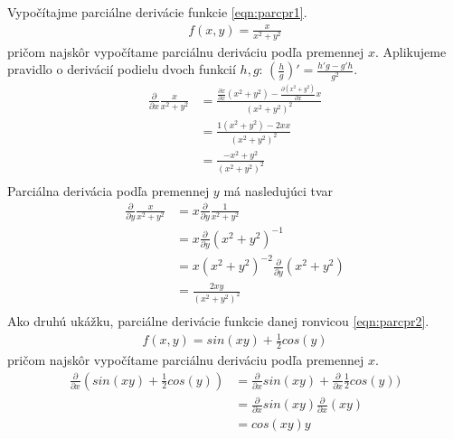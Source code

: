 \documentclass[../main.tex]{subfiles}
\begin{document}
Vypočítajme parciálne derivácie funkcie \ref{eqn:parcpr1}.
\begin{equation}
    \begin{aligned}
        f(x,y)= \frac{x}{x^2+y^2}
    \end{aligned}
    \label{eqn:parcpr1}
\end{equation}
pričom najskôr vypočítame parciálnu deriváciu podľa premennej $x$. Aplikujeme pravidlo o derivácií podielu dvoch funkcií $h,g$: $(\frac{h}{g})'= \frac{h'g-g'h}{g^2}$.
\begin{equation}
	\begin{aligned}
	\frac{\partial}{\partial x}\frac{x}{x^2+y^2} &= \frac{\frac{\partial x}{\partial x}(x^2+y^2)-\frac{\partial (x^2+y^2)}{\partial x}x}{(x^2+y^2)^2} \\
	&= \frac{1(x^2+y^2)-2xx}{(x^2+y^2)^2}\\
	&= \frac{-x^2+y^2}{(x^2+y^2)^2}\\
	\end{aligned}
	\label{eqn:PDx}
\end{equation}
Parciálna derivácia podľa premennej $y$ má nasledujúci tvar 
\begin{equation}
	\begin{aligned}
	\frac{\partial}{\partial y}\frac{x}{x^2+y^2} &= x\frac{\partial}{\partial y}\frac{1}{x^2+y^2} \\
	&= x\frac{\partial}{\partial y}(x^2+y^2)^{-1} \\
	&= x(x^2+y^2)^{-2}\frac{\partial}{\partial y}(x^2+y^2) \\
	&= \frac{2xy}{(x^2+y^2)^{2}} \\
	\end{aligned}
	\label{eqn:PDy}
\end{equation}
Ako druhú ukážku, parciálne derivácie funkcie danej ronvicou \ref{eqn:parcpr2}.
\begin{equation}
    \begin{aligned}
f(x,y)= sin(xy)+\frac{1}{2}cos(y)
    \end{aligned}
    \label{eqn:parcpr2}
\end{equation} 
pričom najskôr vypočítame parciálnu deriváciu podľa premennej $x$.
\begin{equation}
	\begin{aligned}
	\frac{\partial}{\partial x}(sin(xy)+\frac{1}{2}cos(y)) &= \frac{\partial}{\partial x}sin(xy)+\frac{\partial}{\partial x}\frac{1}{2}cos(y)) \\
	&= \frac{\partial}{\partial x}sin(xy)\frac{\partial}{\partial x}(xy)\\
	&= cos(xy)y \\
	\end{aligned}
	\label{eqn:PDx2}
\end{equation}
\end{document}
